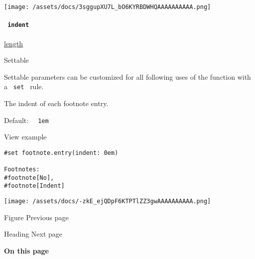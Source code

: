 \texttt{[image: /assets/docs/3sggupXU7L\_bO6KYRBDWHQAAAAAAAAAA.png]}

\paragraph{\texorpdfstring{\texttt{\ indent\ }}{ indent }}\label{definitions-entry-indent}

\href{/docs/reference/layout/length/}{length}

{{ Settable }}

\label{definitions-entry-indent-settable-tooltip}
Settable parameters can be customized for all following uses of the
function with a \texttt{\ set\ } rule.

The indent of each footnote entry.

Default: \texttt{\ }{\texttt{\ 1em\ }}\texttt{\ }


View example

\begin{verbatim}
#set footnote.entry(indent: 0em)

Footnotes:
#footnote[No],
#footnote[Indent]
\end{verbatim}

\texttt{[image: /assets/docs/-zkE\_ejQDpF6KTPTlZZ3gwAAAAAAAAAA.png]}

\href{/docs/reference/model/figure/}{\pandocbounded{}}

{ Figure } { Previous page }

\href{/docs/reference/model/heading/}{\pandocbounded{}}

{ Heading } { Next page }

\textbf{On this page}

